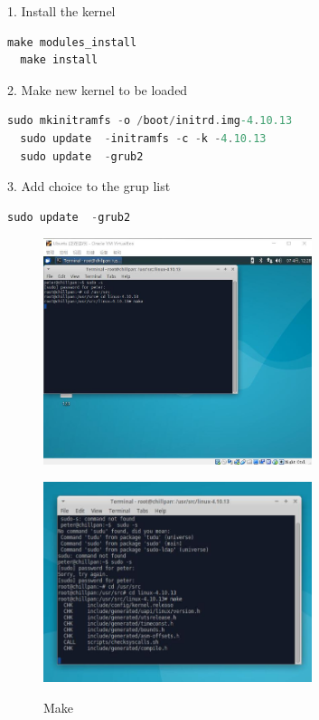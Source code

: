 \documentclass[12pt,a4paper]{article}
\begin{document}
1. Install the kernel

\begin{lstlisting}[language = C]
  make modules_install
  make install
\end{lstlisting}

2. Make new kernel to be loaded

\begin{lstlisting}[language = C]
  sudo mkinitramfs -o /boot/initrd.img-4.10.13
  sudo update  -initramfs -c -k -4.10.13
  sudo update  -grub2
\end{lstlisting}

3. Add choice to the grup list

\begin{lstlisting}[language = C]
  sudo update  -grub2
\end{lstlisting}

\begin{minipage}{0.5\textwidth}
	\begin{figure}[H]
		\centering
		\includegraphics[width= 0.7\textwidth]{./fig/13_make.jpg}
	\end{figure}
\end{minipage}
\begin{minipage}{0.5\textwidth}
	\begin{figure}[H]
		\centering
		\includegraphics[width= 0.7\textwidth]{./fig/make.jpg}
	\end{figure}
\end{minipage}
\begin{figure}[H]
	\centering
	\caption{Make}
\end{figure}
\end{document}
